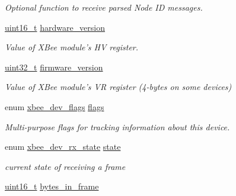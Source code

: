 \begin{DoxyCompactItemize}
\begin{DoxyCompactList}\small\item\em Optional function to receive parsed Node I\-D messages. \end{DoxyCompactList}\item 
\hypertarget{group__xbee__device_gad4c7c16c071f95965e2e506752b450fe}{\hyperlink{group__hal_ga5a8b2dc9e45a9ee81a94ef304fb62505}{uint16\-\_\-t} \hyperlink{group__xbee__device_gad4c7c16c071f95965e2e506752b450fe}{hardware\-\_\-version}}\label{group__xbee__device_gad4c7c16c071f95965e2e506752b450fe}

\begin{DoxyCompactList}\small\item\em Value of X\-Bee module's H\-V register. \end{DoxyCompactList}\item 
\hypertarget{group__xbee__device_gac8e0f35fdeff288dd1a7b4f49754c9b2}{\hyperlink{group__hal__dos_ga09a1e304d66d35dd47daffee9731edaa}{uint32\-\_\-t} \hyperlink{group__xbee__device_gac8e0f35fdeff288dd1a7b4f49754c9b2}{firmware\-\_\-version}}\label{group__xbee__device_gac8e0f35fdeff288dd1a7b4f49754c9b2}

\begin{DoxyCompactList}\small\item\em Value of X\-Bee module's V\-R register (4-\/bytes on some devices) \end{DoxyCompactList}\item 
\hypertarget{group__xbee__device_ga9ac684521a8154bddc272049a7a61b73}{enum \hyperlink{group__xbee__device_ga80478d6b87ebdf34b5ec06e5ca6f309e}{xbee\-\_\-dev\-\_\-flags} \hyperlink{group__xbee__device_ga9ac684521a8154bddc272049a7a61b73}{flags}}\label{group__xbee__device_ga9ac684521a8154bddc272049a7a61b73}

\begin{DoxyCompactList}\small\item\em Multi-\/purpose flags for tracking information about this device. \end{DoxyCompactList}\item 
\hypertarget{group__xbee__device_ga758a79cfaf819f091728c06474466321}{enum \hyperlink{group__xbee__device_ga30374ada0aff261c5da7557882fd09de}{xbee\-\_\-dev\-\_\-rx\-\_\-state} \hyperlink{group__xbee__device_ga758a79cfaf819f091728c06474466321}{state}}\label{group__xbee__device_ga758a79cfaf819f091728c06474466321}

\begin{DoxyCompactList}\small\item\em current state of receiving a frame \end{DoxyCompactList}\item 
\hypertarget{group__xbee__device_ga1048ca0eb1adc5759a0df48ae8ae740a}{\hyperlink{group__hal_ga5a8b2dc9e45a9ee81a94ef304fb62505}{uint16\-\_\-t} \hyperlink{group__xbee__device_ga1048ca0eb1adc5759a0df48ae8ae740a}{bytes\-\_\-in\-\_\-frame}}\label{group__xbee__device_ga1048ca0eb1adc5759a0df48ae8ae740a}


\end{DoxyCompactItemize}
